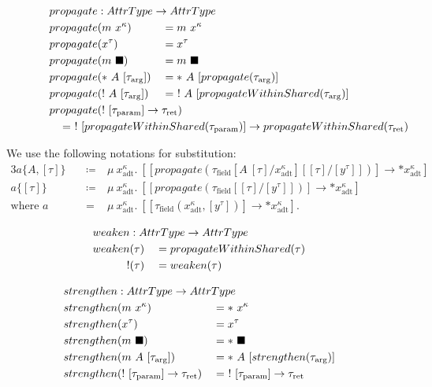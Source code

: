 \begin{alignat*}{3}
  propagate &: \mathrlap{AttrType \to AttrType} \\
  propagate&(m\ x^\kappa) &&= m\ x^\kappa \\
  propagate&(x^\tau) &&= x^\tau \\
  propagate&(m\ \blacksquare) &&= m\ \blacksquare \\
  propagate&(*\ A\ [\tau_\text{arg}]) &&= *\ A\ [propagate(\tau_\text{arg})] \\
  propagate&(!\ A\ [\tau_\text{arg}]) &&= \ !\ A\ [propagateWithinShared(\tau_\text{arg})] \\
  propagate&\mathrlap{(!\ [\tau_\text{param}] \to \tau_\text{ret})} \\
  \mathclap{\hspace{25em}= \ !\ [propagateWithinShared(\tau_\text{param})] \to propagateWithinShared(\tau_\text{ret})}
\end{alignat*}

We use the following notations for substitution:
\begin{alignat*}{3}
  a\{A, [\tau]\}\ &&\coloneqq&\ \mu\ x^\kappa_\text{adt}.\ [[propagate(\tau_\text{field}[A\ [\tau]/x^\kappa_\text{adt}][[\tau]/[y^\tau]])] \to *x^\kappa_\text{adt}] \\
  a\{[\tau]\}\ &&\coloneqq&\ \mu\ x^\kappa_\text{adt}.\ [[propagate(\tau_\text{field}[[\tau]/[y^\tau]])] \to *x^\kappa_\text{adt}] \\
  \text{where } a &&=&\ \mu\ x^\kappa_\text{adt}.\ [[\tau_\text{field}(x^\kappa_\text{adt}, [y^\tau])] \to *x^\kappa_\text{adt}].
\end{alignat*}


\begin{alignat*}{3}
  weaken &: \mathrlap{AttrType \to AttrType} \\
  weaken&(\tau) &&= propagateWithinShared(\tau) \\
  !&(\tau) &&= weaken(\tau)
\end{alignat*}

\begin{alignat*}{3}
  strengthen &: \mathrlap{AttrType \to AttrType} \\
  strengthen&(m\ x^\kappa) &&= *\ x^\kappa \\
  strengthen&(x^\tau) &&= x^\tau \\
  strengthen&(m\ \blacksquare) &&= *\ \blacksquare \\
  strengthen&(m\ A\ [\tau_\text{arg}]) &&= *\ A\ [strengthen(\tau_\text{arg})] \\
  strengthen&(!\ [\tau_\text{param}] \to \tau_\text{ret}) &&=\ !\ [\tau_\text{param}] \to \tau_\text{ret} \\
\end{alignat*}

